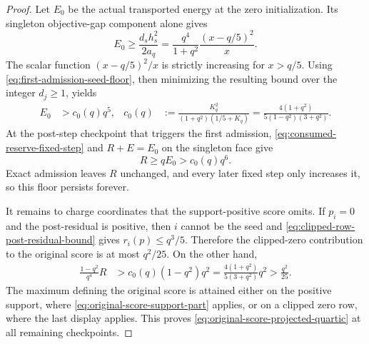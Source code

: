 \begin{proof}
Let $E_0$ be the actual transported energy at the zero initialization.  Its
singleton objective-gap component alone gives
\begin{equation*}
 E_0\geq \frac{d_sh_s^2}{2a_q}
 =\frac{q^4}{1+q^2}\frac{(x-q/5)^2}{x}.
\end{equation*}
The scalar function $(x-q/5)^2/x$ is strictly increasing for $x>q/5$.
Using \cref{eq:first-admission-seed-floor}, then minimizing the resulting
bound over the integer $d_j\geq1$, yields
\begin{align}
 E_0
 &>c_0(q)q^5,
 &c_0(q)
 &:=\frac{K_q^2}{(1+q^2)(1/5+K_q)}
 =\frac{4(1+q^2)}{5(1-q^2)(3+q^2)}.
 \label{eq:first-admission-energy-floor}
\end{align}
At the post-step checkpoint that triggers the first admission,
\cref{eq:consumed-reserve-fixed-step} and $R+E=E_0$ on the singleton face
give
\begin{equation}
 R\geq qE_0>c_0(q)q^6.
 \label{eq:first-admission-reserve-floor}
\end{equation}
Exact admission leaves $R$ unchanged, and every later fixed step only
increases it, so this floor persists forever.

It remains to charge coordinates that the support-positive score omits.  If
$p_i=0$ and the post-residual is positive, then $i$ cannot be the seed and
\cref{eq:clipped-row-post-residual-bound} gives $r_i(p)\leq q^3/5$.
Therefore the clipped-zero contribution to the original score is at most
$q^2/25$.  On the other hand,
\begin{align*}
 \frac{1-q^2}{q^4}R
 &>c_0(q)(1-q^2)q^2
 =\frac{4(1+q^2)}{5(3+q^2)}q^2
 >\frac{q^2}{25}.
\end{align*}
The maximum defining the original score is attained either on the positive
support, where \cref{eq:original-score-support-part} applies, or on a clipped
zero row, where the last display applies.  This proves
\cref{eq:original-score-projected-quartic} at all remaining checkpoints.
\end{proof}
